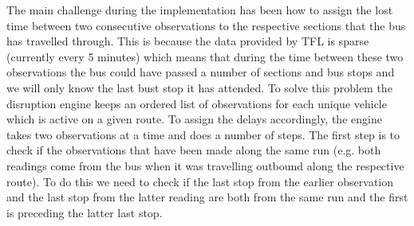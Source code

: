 The main challenge during the implementation has been how to assign the lost time between two consecutive observations to the respective sections that the bus has travelled through. This is because the data provided by TFL is sparse (currently every 5 minutes) which means that during the time between these two observations the bus could have passed a number of sections and bus stops and we will only know the last bust stop it has attended. To solve this problem the disruption engine keeps an ordered list of observations for each unique vehicle which is active on a given route. To assign the delays accordingly, the engine takes two observations at a time and does a number of steps. The first step is to check if the observations that have been made along the same run (e.g. both readings come from the bus when it was travelling outbound along the respective route). To do this we need to check if the last stop from the earlier observation and the last stop from the latter reading are both from the same run and the first is preceding the latter last stop.

